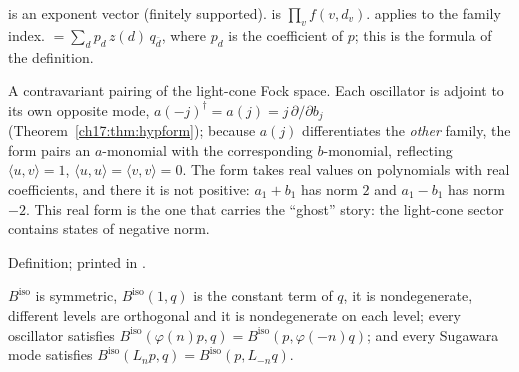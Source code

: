 \begin{dictionary}
 is an exponent vector (finitely supported).   is $\prod_vf(v,d_v)$.
 applies  to the family index.   $=\sum_dp_d\,z(d)\,q_{\bar d}$,
where $p_d$ is the coefficient of $p$; this is the formula of the definition.
\end{dictionary}

\begin{physics}
A contravariant pairing of the light-cone Fock space.  Each oscillator is adjoint to its own opposite mode,
$a(-j)^\dagger=a(j)=j\,\partial/\partial b_j$ (Theorem~\ref{ch17:thm:hypform}); because $a(j)$ differentiates the \emph{other}
family, the form pairs an $a$-monomial with the corresponding $b$-monomial, reflecting $\langle u,v\rangle=1$,
$\langle u,u\rangle=\langle v,v\rangle=0$.  The form takes real values on polynomials with real coefficients, and there it is
not positive: $a_1+b_1$ has norm $2$ and $a_1-b_1$ has norm $-2$.  This real form is the one that carries the
``ghost'' story: the light-cone sector contains states of negative norm.
\end{physics}

\begin{status}
Definition; printed in .
\end{status}

\begin{theorem}\label{ch17:thm:hypform}
$B^{\mathrm{iso}}$ is symmetric, $B^{\mathrm{iso}}(1,q)$ is the constant term of $q$, it is nondegenerate, different
levels are orthogonal and it is nondegenerate on each level; every oscillator satisfies
$B^{\mathrm{iso}}(\varphi(n)p,q)=B^{\mathrm{iso}}(p,\varphi(-n)q)$; and every Sugawara mode satisfies
$B^{\mathrm{iso}}(L_np,q)=B^{\mathrm{iso}}(p,L_{-n}q)$.
\end{theorem}

